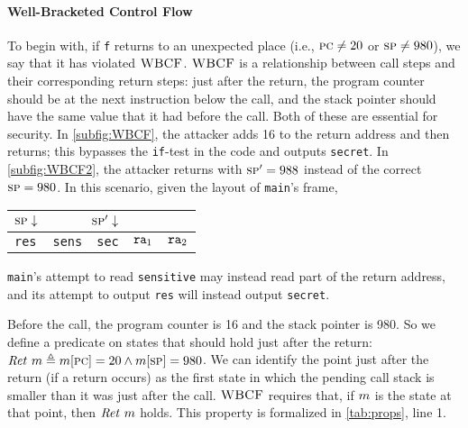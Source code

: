 \documentclass[10pt,conference]{ieeetran}%
\theoremstyle{definition}
\begin{document}
\paragraph*{Well-Bracketed Control Flow}

To begin with, if {\tt f} returns to an unexpected place (i.e., \(\PCname \neq 20\) or
\(\SP \neq 980\)), we say that it has violated \(\wbcf\). \(\wbcf\) is a relationship between
call steps and their corresponding return steps: just after the return, the program
counter should be at the next instruction below the call,
and the stack pointer should have the same value that it had before the call.
Both of these are essential for security. In \cref{subfig:WBCF}, the attacker adds
16 to the return address and then returns; this bypasses the {\tt if}-test in the code and outputs
{\tt secret}.
In \cref{subfig:WBCF2}, the attacker returns with \(\SP' = 988\) instead of the
correct \(\SP = 980\). In this scenario, given the layout of {\tt main}'s frame,
\begin{center}
\begin{tabular}{| l | l | l | l | l |}
  \multicolumn{1}{r}{\(\SP \downarrow\)} &
  \multicolumn{2}{r}{\(\SP' \downarrow\)} \\
  \hline
  {\tt res} & {\tt sens} & {\tt sec} & \(\mbox{\tt ra}_1\) & \(\mbox{\tt ra}_2\) \\
  \hline
\end{tabular}
\end{center}

\vspace{\abovedisplayskip}

\noindent
{\tt main}'s attempt to read {\tt sensitive} may instead
read part of the return address, and its attempt to output
{\tt res} will instead output {\tt secret}.

Before the call, the program counter is 16 and the stack pointer is 980.
So we define a predicate on states that should hold just after the return:
\(\ret\ \mach \triangleq \mach[\PCname] = 20 \wedge \mach[\SP] = 980\).
%
We can identify the point just after the return (if a return occurs)
as the first state in which the pending call stack is smaller than it was
just after the call.
\(\wbcf\) requires that, if \(\mach\) is the state at that point, then \(\ret ~ \mach\) holds.
This property is formalized in \cref{tab:props}, line 1.
\end{document}
